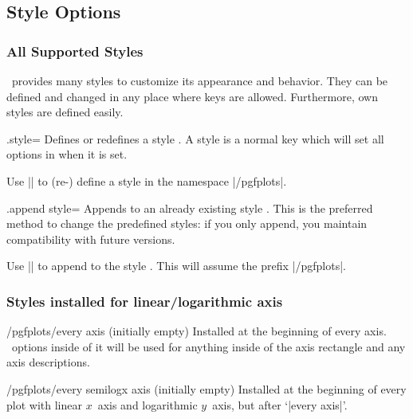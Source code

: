 
\subsection{Style Options}
\label{sec:styles}
\subsubsection{All Supported Styles}
\PGFPlots\ provides many styles to customize its appearance and behavior. They can be defined and changed in any place where keys are allowed. Furthermore, own styles are defined easily.

\begin{handler}{{.style}=}
	Defines or redefines a style . A style is a normal key which will set all options in  when it is set.

	Use	|| to (re-) define a style  in the namespace |/pgfplots|.
\end{handler}

\begin{handler}{{.append style}=}
	Appends  to an already existing style . This is the preferred method to change the predefined styles: if you only append, you maintain compatibility with future versions.

	Use	|| to append  to the style . This will assume the prefix |/pgfplots|.
\end{handler}

\subsubsection*{Styles installed for linear/logarithmic axis}

\begin{stylekey}{/pgfplots/every axis (initially empty)}
 Installed at the beginning of every axis. \Tikz\ options inside of it will be used for anything inside of the axis rectangle and any axis descriptions.
\end{stylekey}

\begin{stylekey}{/pgfplots/every semilogx axis (initially empty)}
 Installed at the beginning of every plot with linear $x$~axis and logarithmic $y$~axis, but after `|every axis|'.
\end{stylekey}

